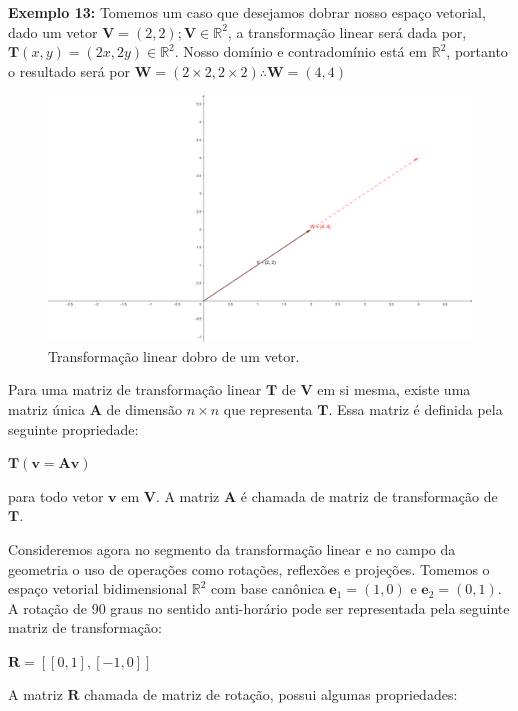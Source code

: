 \noindent\textbf{Exemplo 13:} Tomemos um caso que desejamos dobrar nosso espaço vetorial, dado um vetor $\mathbf{V} = (2, 2); \mathbf{V} \in \mathbb{R}^2$, a transformação linear será dada por, $\mathbf{T}(x, y) = (2x, 2y) \in \mathbb{R}^2$. Nosso domínio e contradomínio está em $\mathbb{R}^2$, portanto o resultado será por $\mathbf{W} = (2 \times 2, 2 \times 2) \therefore \mathbf{W} = (4, 4)$

\begin{figure}[H]
	\centering
	\includegraphics[scale=1.30]{t_exemplo13.png}
	\caption{Transformação linear dobro de um vetor.}
\end{figure}

Para uma matriz de transformação linear $\mathbf{T}$ de $\mathbf{V}$ em si mesma, existe uma matriz única $\mathbf{A}$ de dimensão $ n \times n$ que representa $\mathbf{T}$. Essa matriz é definida pela seguinte propriedade:

\centerline{$\mathbf{T}(\mathbf{v} = \mathbf{A}\mathbf{v})$}

\noindent para todo vetor $\mathbf{v}$ em $\mathbf{V}$. A matriz $\mathbf{A}$ é chamada de matriz de transformação de $\mathbf{T}$.

Consideremos agora no segmento da transformação linear e no campo da geometria o uso de operações como rotações, reflexões e projeções. Tomemos o espaço vetorial bidimensional $\mathbb{R}^2$ com base canônica $\mathbf{e}_1 = (1, 0)$ e $\mathbf{e}_2 = (0, 1)$. A rotação de 90 graus no sentido anti-horário pode ser representada pela seguinte matriz de transformação:

\centerline{$\mathbf{R} = [[0, 1], [-1, 0]]$}

A matriz $\mathbf{R}$ chamada de matriz de rotação, possui algumas propriedades:

